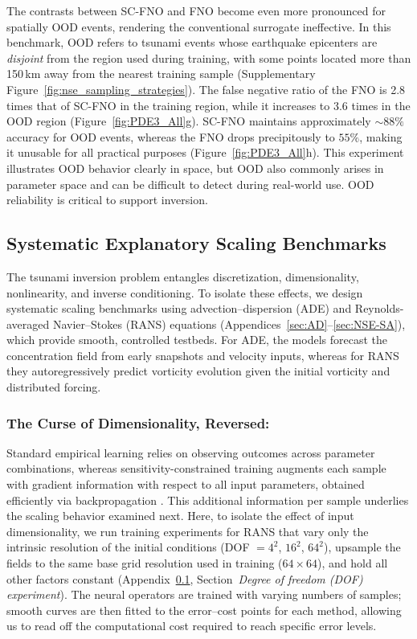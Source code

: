 The contrasts between SC-FNO and FNO become even more pronounced for spatially OOD events, rendering the conventional surrogate ineffective. In this benchmark, OOD refers to tsunami events whose earthquake epicenters are \emph{disjoint} from the region used during training, with some points located more than 150\,km away from the nearest training sample (Supplementary Figure~\ref{fig:nse_sampling_strategies}). The false negative ratio of the FNO is 2.8 times that of SC-FNO in the training region, while it increases to 3.6 times in the OOD region (Figure~\ref{fig:PDE3_All}g). SC-FNO maintains approximately $\sim88\%$ accuracy for OOD events, whereas the FNO drops precipitously to $55\%$, making it unusable for all practical purposes (Figure~\ref{fig:PDE3_All}h). This experiment illustrates OOD behavior clearly in space, but OOD also commonly arises in parameter space and can be difficult to detect during real-world use. OOD reliability is critical to support inversion.

\subsection{Systematic Explanatory Scaling Benchmarks}
\label{sec:AD_NSE}
The tsunami inversion problem entangles discretization, dimensionality, nonlinearity, and inverse conditioning. To isolate these effects, we design systematic scaling benchmarks using advection--dispersion (ADE) and Reynolds-averaged Navier--Stokes (RANS) equations (Appendices~\ref{sec:AD}--\ref{sec:NSE-SA}), which provide smooth, controlled testbeds. For ADE, the models forecast the concentration field from early snapshots and velocity inputs, whereas for RANS they autoregressively predict vorticity evolution given the initial vorticity and distributed forcing.

\subsubsection{The Curse of Dimensionality, Reversed:}
Standard empirical learning relies on observing outcomes across parameter combinations, whereas sensitivity-constrained training augments each sample with gradient information with respect to all input parameters, obtained efficiently via backpropagation \citep{rumelhart1986learning}. This additional information per sample underlies the scaling behavior examined next. Here, to isolate the effect of input dimensionality, we run training experiments for RANS that vary only the intrinsic resolution of the initial conditions (DOF $=4^2$, $16^2$, $64^2$), upsample the fields to the same base grid resolution used in training ($64\times64$), and hold all other factors constant (Appendix~\ref{sec:AD_NSE}, Section~\textit{Degree of freedom (DOF) experiment}). The neural operators are trained with varying numbers of samples; smooth curves are then fitted to the error--cost points for each method, allowing us to read off the computational cost required to reach specific error levels.




